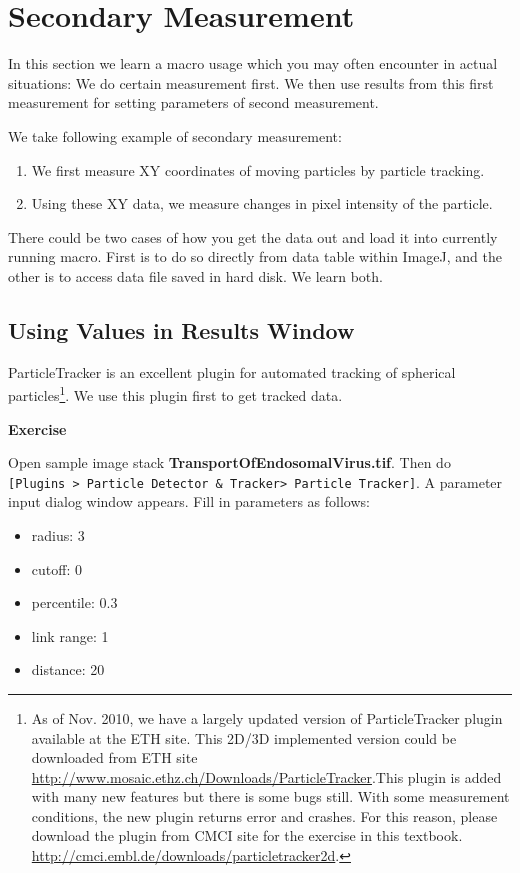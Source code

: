 \documentclass[11pt,a4paper,oneside]{report}
\newenvironment{indentexercise}[1]%
{{\setlength{\leftmargin}{2em}}%
\textbf{Exercise \thesubsection-#1}%
\begin{list}{}%
	\item%
}
{\end{list}}
\newcommand{\ijmenu}[1]{\texttt{\small#1}}
\begin{document}
\section{Secondary Measurement}
In this section we learn a macro usage which you may often encounter in actual situations: We do certain measurement first. We then use results from this first measurement for setting parameters of second measurement.  

We take following example of secondary measurement: 
\begin{enumerate}
\item We first measure XY coordinates of moving particles by particle tracking.  
\item Using these XY data, we measure changes in pixel intensity of the particle.
\end{enumerate} 
There could be two cases of how you get the data out and load it into currently running macro. First is to do so directly from data table within ImageJ, and the other is to access data file saved in hard disk. We learn both. 

\subsection{Using Values in Results Window}

ParticleTracker is an excellent plugin for automated tracking of spherical particles\footnote{ As of Nov. 2010, we have a largely updated version of ParticleTracker plugin available at the ETH site. This 2D/3D implemented version could be downloaded from ETH site \url{
http://www.mosaic.ethz.ch/Downloads/ParticleTracker}.This plugin is added with many new features but there is some bugs still. With some measurement conditions, the new plugin returns error and crashes. For this reason, please download the plugin from CMCI site for the exercise in this textbook. \url{http://cmci.embl.de/downloads/particletracker2d}.  }. We use this plugin first to get tracked data. 

\begin{indentexercise}{1}
\item Open sample image stack \textbf{TransportOfEndosomalVirus.tif}. Then do \ijmenu{[Plugins > Particle Detector \& Tracker> Particle Tracker]}. A parameter input dialog window appears. Fill in  parameters as follows:
\begin{itemize}
\item radius: 3
\item cutoff: 0
\item percentile: 0.3
\item link range: 1
\item distance: 20
\end{itemize}
\end{indentexercise}
\end{document}

